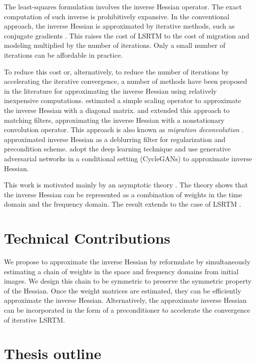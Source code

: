 The least-squares formulation involves the inverse Hessian operator. The exact computation of such inverse is prohibitively expansive. In the conventional approach, the inverse Hessian is approximated by iterative methods, such as conjugate gradients \cite[]{tarantola,sun,xue}. This raises the cost of LSRTM to the cost of migration and modeling multiplied by the number of iterations. Only a small number of iterations can be affordable in practice. 

To reduce this cost or, alternatively, to reduce the number of iterations by accelerating the iterative convergence, a number of methods have been proposed in the literature for approximating the inverse Hessian using relatively inexpensive computations. \cite{rickett} estimated a simple scaling operator to approximate the inverse Hessian with a diagonal matrix. \cite{guitton} and \cite{greer} extended this approach to matching filters, approximating the inverse Hessian with a nonstationary convolution operator. This approach is also known as \emph{migration deconvolution} \cite[]{hu2001,yu2006}. \cite{aoki} approximated inverse Hessian as a deblurring filter for regularization and precondition scheme. \cite{kaur} adopt the deep learning technique and use generative adversarial networks in a conditional setting (CycleGANs) to approximate inverse Hessian.


This work is motivated mainly by an asymptotic theory \cite[]{miller1987,bleistein1987}. The theory shows that the inverse Hessian can be represented as a combination of weights in the time domain and the frequency domain. The result extends to the case of LSRTM \cite[]{hou15,hou16}. 

\section{Technical Contributions}

We propose to approximate the inverse Hessian by reformulate by simultaneously estimating a chain of weights in the space and frequency domains from initial images. We design this chain to be symmetric to preserve the symmetric property of the Hessian.
Once the weight matrices are estimated, they can be efficiently approximate the inverse Hessian. Alternatively, the approximate inverse Hessian can be incorporated in the form of a preconditioner to accelerate the convergence of iterative LSRTM.


\section{Thesis outline}

